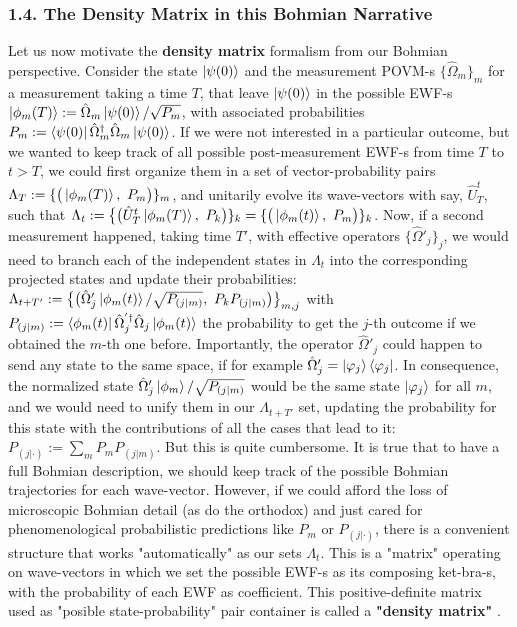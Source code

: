 \documentclass[11pt, a4paper]{article} %
\begin{document}
\subsubsection*{1.4. The Density Matrix in this Bohmian Narrative}\vspace{-0.15cm}
Let us now motivate the \textbf{density matrix} formalism from our Bohmian perspective. Consider the state $\ket{\psi(0)}$ and the measurement POVM-s $\{\hat{\Omega}_m\}_m$ for a measurement taking a time $T$, that leave $\ket{\psi(0)}$ in the possible EWF-s $\ket{\phi_m(T)}:=\hat{\Omega}_m\ket{\psi(0)}/\sqrt{P_m}$, with associated probabilities $P_m:=\bra{\psi(0)}\hat{\Omega}_m^\dagger \hat{\Omega}_m\ket{\psi(0)}$. If we were not interested in a particular outcome, but we wanted to keep track of all possible post-measurement EWF-s from time $T$ to $t>T$, we could first organize them in a set of vector-probability pairs $\Lambda_{T}:=\{\big(\ket{\phi_m(T)},\ P_m\big)\}_m$, and unitarily evolve its wave-vectors with say, $\hat{U}_{T}^{t}$, such that $\Lambda_{t}:=\big\{\big(\hat{U}^t_T\ket{\phi_m(T)},\ P_k\big)\}_k=\{\big(\ket{\phi_m(t)},\ P_m\big)\}_k$. Now, if a second measurement happened, taking time $T'$, with effective operators $\{\hat{\Omega}'_j\}_j$, we would need to branch each of the independent states in $\Lambda_t$ into the corresponding projected states and update their probabilities: $\Lambda_{t+T'}:=\big\{ \big(\hat{\Omega}_j'\ket{\phi_m(t)}/\sqrt{P_{(j|m)}},\ P_kP_{(j|m)}\big)\big\}_{m,j}$ with $P_{(j|m)}:=\bra{\phi_m(t)}\hat{\Omega}^{'\dagger}_j\hat{\Omega}_j\ket{\phi_m(t)}$ the probability to get the $j$-th outcome if we obtained the $m$-th one before. Importantly, the operator $\hat{\Omega}'_j$ could happen to send any state to the same space, if for example $\hat{\Omega}'_j=\ket{\varphi_j}\bra{\varphi_j}$. In consequence, the normalized state $\hat{\Omega}'_j \ket{\phi_m}/\sqrt{P_{(j|m)}}$ would be the same state $\ket{\varphi_j}$ for all $m$, and we would need to unify them in our $\Lambda_{t+T'}$ set, updating the probability for this state with the contributions of all the cases that lead to it: $P_{(j|\cdot)}:=\sum_m P_mP_{(j|m)}$. But this is quite cumbersome. It is true that to have a full Bohmian description, we should keep track of the possible Bohmian trajectories for each wave-vector. However, if we could afford the loss of microscopic Bohmian detail (as do the orthodox) and just cared for phenomenological probabilistic predictions like $P_m$ or $P_{(j|\cdot)}$, there is a convenient structure that works "automatically" as our sets $\Lambda_t$. This is a "matrix" operating on wave-vectors in which we set the possible EWF-s as its composing ket-bra-s, with the probability of each EWF as coefficient. This positive-definite matrix used as "posible state-probability" pair container is called a {\bf "density matrix"} \cite{vonNeumann, Durr, Holland}. 
\end{document}
